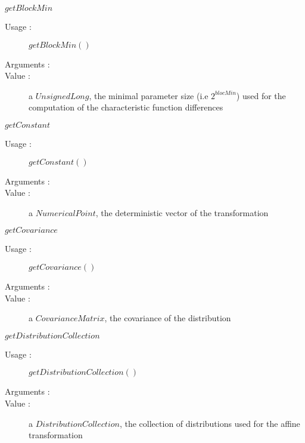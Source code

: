 \begin{description}
\begin{description}
  \item $getBlockMin$
    \begin{description}
    \item[Usage :]  $getBlockMin()$
    \item[Arguments :]  \strut
    \item[Value :] a $UnsignedLong$, the minimal parameter size (i.e $2^{blocMin}$) used for the computation of the characteristic function differences
    \end{description}

  \item $getConstant$
    \begin{description}
    \item[Usage :]  $getConstant()$
    \item[Arguments :]  \strut
    \item[Value :] a $NumericalPoint$, the deterministic vector of the transformation
    \end{description}

  \item $getCovariance$
    \begin{description}
    \item[Usage :]  $getCovariance()$
    \item[Arguments :]  \strut
    \item[Value :] a $CovarianceMatrix$, the covariance of the distribution
    \end{description}

  \item $getDistributionCollection$
    \begin{description}
    \item[Usage :]  $getDistributionCollection()$
    \item[Arguments :]  \strut
    \item[Value :] a $DistributionCollection$, the collection of distributions used for the affine transformation
    \end{description}


\end{description}
\end{description}
